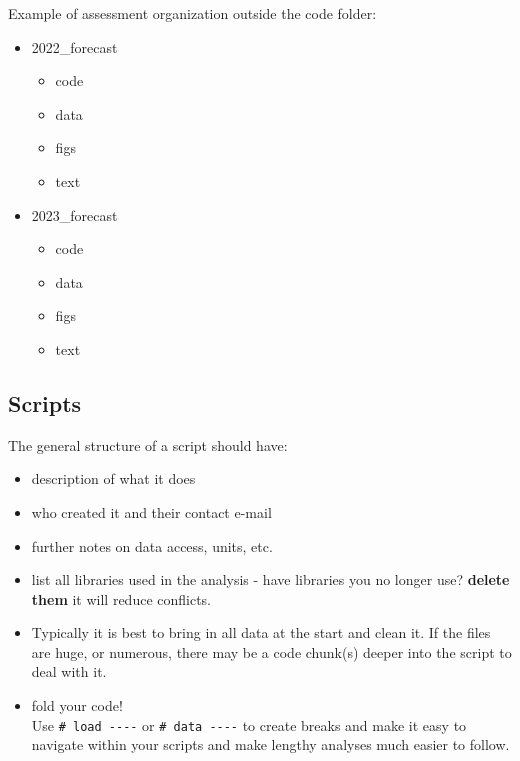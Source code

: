 \documentclass[
]{article}
\providecommand{\tightlist}{%
  \setlength{\itemsep}{0pt}\setlength{\parskip}{0pt}}
\begin{document}
Example of assessment organization outside the code folder:

\begin{itemize}
\item
  2022\_forecast

  \begin{itemize}
  \item
    code
  \item
    data
  \item
    figs
  \item
    text
  \end{itemize}
\item
  2023\_forecast

  \begin{itemize}
  \item
    code
  \item
    data
  \item
    figs
  \item
    text
  \end{itemize}
\end{itemize}

\hypertarget{scripts}{%
\subsection{Scripts}\label{scripts}}

The general structure of a script should have:

\begin{itemize}
\tightlist
\item
  description of what it does
\item
  who created it and their contact e-mail
\item
  further notes on data access, units, etc.
\item
  list all libraries used in the analysis - have libraries you no longer
  use? \textbf{delete them} it will reduce conflicts.
\item
  Typically it is best to bring in all data at the start and clean it.
  If the files are huge, or numerous, there may be a code chunk(s)
  deeper into the script to deal with it.
\item
  fold your code!\\
  Use \texttt{\#\ load\ -\/-\/-\/-} or \texttt{\#\ data\ -\/-\/-\/-} to
  create breaks and make it easy to navigate within your scripts and
  make lengthy analyses much easier to follow.
\end{itemize}
\end{document}
